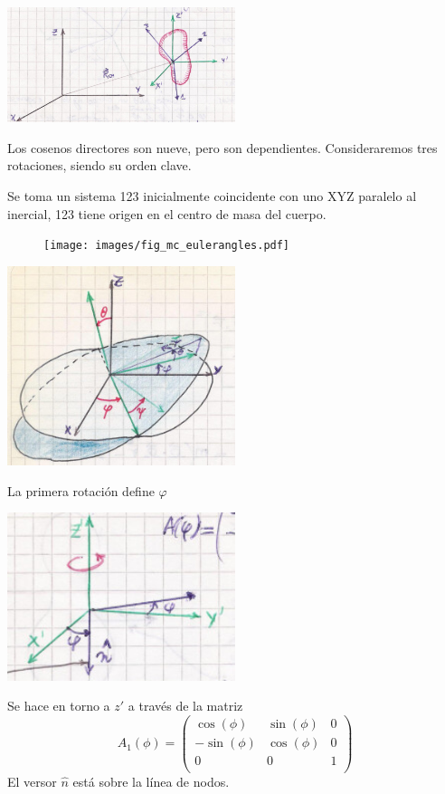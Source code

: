 \documentclass[10pt,oneside]{CBFT_book}
\begin{document}
\includegraphics[width=0.5\textwidth]{images/fig_mc_sistema_euler_angles.jpg}

Los cosenos directores son nueve, pero son dependientes.
Consideraremos tres rotaciones, siendo su orden clave.

Se toma un sistema 123 inicialmente coincidente con uno XYZ paralelo al inercial, 123 tiene origen
en el centro de masa del cuerpo.

\begin{figure}[htb]
	\begin{center}
	\texttt{[image: images/fig\_mc\_eulerangles.pdf]}	 
	\end{center}
	\caption{}
\end{figure} 

\includegraphics[width=0.5\textwidth]{images/fig_mc_sistema_euler_angles_carpeta.jpg}

La primera rotación define $\varphi$ 

\includegraphics[width=0.5\textwidth]{images/fig_mc_euler_angles_1.jpg}

Se hace en torno a $z'$ a través de la matriz
\[
	A_1(\phi) = 
	\begin{pmatrix}
		\cos(\phi) & \sin(\phi) & 0 \\
		-\sin(\phi) & \cos(\phi) & 0 \\ 
		0 & 0 & 1  \\
	\end{pmatrix}
\]
El versor $\hat{n}$ está sobre la línea de nodos.
\end{document}
